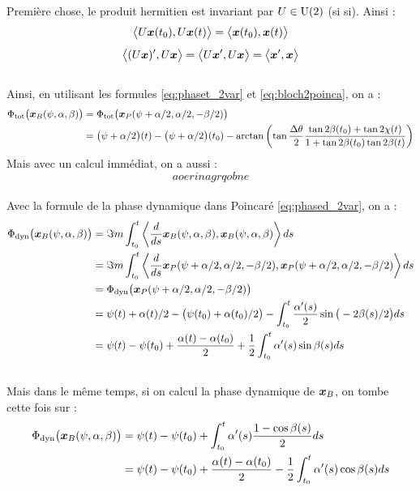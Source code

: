 \begin{annexe}
Première chose, le produit hermitien est invariant par $U\in\text{\normalfont U}(2)$ (si si). Ainsi :
\[\big\langle U\boldsymbol{x}(t_0), U\boldsymbol{x}(t) \big\rangle = \big\langle \boldsymbol{x}(t_0), \boldsymbol{x}(t) \big\rangle\]
\[\big\langle (U\boldsymbol{x})', U\boldsymbol{x} \big\rangle = \big\langle U\boldsymbol{x}', U\boldsymbol{x} \big\rangle = \big\langle \boldsymbol{x}', \boldsymbol{x} \big\rangle\]
\\
Ainsi, en utilisant les formules \eqref{eq:phaset_2var} et \eqref{eq:bloch2poinca}, on a :
\begin{align*}\Phi_{\text{\normalfont tot}} \big(\boldsymbol{x}_B(\psi, \alpha, \beta) \big) &= \Phi_{\text{\normalfont tot}} \big(\boldsymbol{x}_P(\psi + \alpha/2, \alpha/2, -\beta/2) \big) \\
	&= \big( \psi + \alpha/2 \big)(t) - \big( \psi + \alpha/2 \big)(t_0) - \arctan\left( \tan \frac{\Delta\theta}{2} \frac{ \tan 2\beta(t_0)+\tan 2\chi(t)}{1 + \tan 2\beta(t_0)\tan 2\beta(t)}\right)
\end{align*}
Mais avec un calcul immédiat, on a aussi :
\[aoerinagrqobne\]
\\
Avec la formule de la phase dynamique dans Poincaré \eqref{eq:phased_2var}, on a :
\begin{align*}
	\Phi_{\text{\normalfont dyn}} \big(\boldsymbol{x}_B(\psi, \alpha, \beta) \big) &= \Im m \int_{t_0}^t \left\langle \frac{d}{ds}\boldsymbol{x}_B(\psi, \alpha, \beta), \boldsymbol{x}_B(\psi, \alpha, \beta) \right\rangle ds \\
	&= \Im m \int_{t_0}^t \left\langle \frac{d}{ds}\boldsymbol{x}_P(\psi + \alpha/2, \alpha/2, -\beta/2), \boldsymbol{x}_P(\psi + \alpha/2, \alpha/2, -\beta/2) \right\rangle ds \\
	&= \Phi_{\text{\normalfont dyn}} \big( \boldsymbol{x}_P(\psi + \alpha/2, \alpha/2, -\beta/2) \big) \\
	&= \psi(t) + \alpha(t)/2 - \big( \psi(t_0) + \alpha(t_0)/2 \big) - \int_{t_0}^t \frac{\alpha'(s)}{2} \sin \big( -2\beta(s)/2 \big) ds \\
	&= \psi(t) - \psi(t_0) + \frac{\alpha(t) - \alpha(t_0)}{2} + \frac{1}{2} \int_{t_0}^t \alpha'(s)\sin \beta(s) ds
\end{align*}
\\
Mais dans le même temps, si on calcul la phase dynamique de $\boldsymbol{x}_B$, on tombe cette fois sur :
\begin{align*}
	\phased\big(\x_B(\psi, \alpha, \beta) \big) &= \psi(t) - \psi(t_0) +  \int_{t_0}^t \alpha'(s) \frac{1 - \cos\beta(s)}{2}ds \\
	&= \psi(t) - \psi(t_0) + \frac{\alpha(t) - \alpha(t_0)}{2}- \frac{1}{2} \int_{t_0}^t \alpha'(s) \cos\beta(s) ds 

\end{align*}
\end{annexe}
